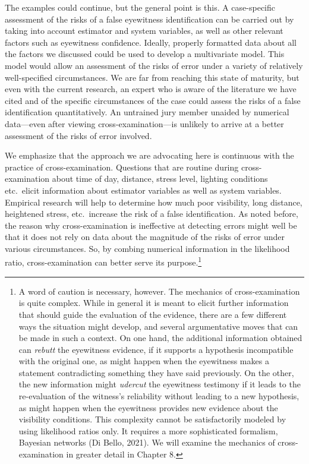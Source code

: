 \documentclass[
  10pt,
  dvipsnames,enabledeprecatedfontcommands]{scrartcl}
\begin{document}
\vspace{1mm}
\footnotesize

\normalsize

The examples could continue, but the general point is this. A
case-specific assessment of the risks of a false eyewitness
identification can be carried out by taking into account estimator and
system variables, as well as other relevant factors such as eyewitness
confidence. Ideally, properly formatted data about all the factors we
discussed could be used to develop a multivariate model. This model
would allow an assessment of the risks of error under a variety of
relatively well-specified circumstances. We are far from reaching this
state of maturity, but even with the current research, an expert who is
aware of the literature we have cited and of the specific circumstances
of the case could assess the risks of a false identification
quantitatively. An untrained jury member unaided by numerical
data---even after viewing cross-examination---is unlikely to arrive at a
better assessment of the risks of error involved.

We emphasize that the approach we are advocating here is continuous with
the practice of cross-examination. Questions that are routine during
cross-examination about time of day, distance, stress level, lighting
conditions etc.~elicit information about estimator variables as well as
system variables. Empirical research will help to determine how much
poor visibility, long distance, heightened stress, etc.~increase the
risk of a false identification. As noted before, the reason why
cross-examination is ineffective at detecting errors might well be that
it does not rely on data about the magnitude of the risks of error under
various circumstances. So, by combing numerical information in the
likelihood ratio, cross-examination can better serve its
purpose.\footnote{A word of caution is necessary, however. The mechanics
  of cross-examination is quite complex. While in general it is meant to
  elicit further information that should guide the evaluation of the
  evidence, there are a few different ways the situation might develop,
  and several argumentative moves that can be made in such a context. On
  one hand, the additional information obtained can \textit{rebutt} the
  eyewitness evidence, if it supports a hypothesis incompatible with the
  original one, as might happen when the eyewitness makes a statement
  contradicting something they have said previously. On the other, the
  new information might \textit{udercut} the eyewitness testimony if it
  leads to the re-evaluation of the witness's reliability without
  leading to a new hypothesis, as might happen when the eyewitness
  provides new evidence about the visibility conditions. This complexity
  cannot be satisfactorily modeled by using likelihood ratios only. It
  requires a more sophisticated formalism, Bayesian networks (Di Bello,
  2021). We will examine the mechanics of cross-examination in greater
  detail in Chapter 8.}
\end{document}
